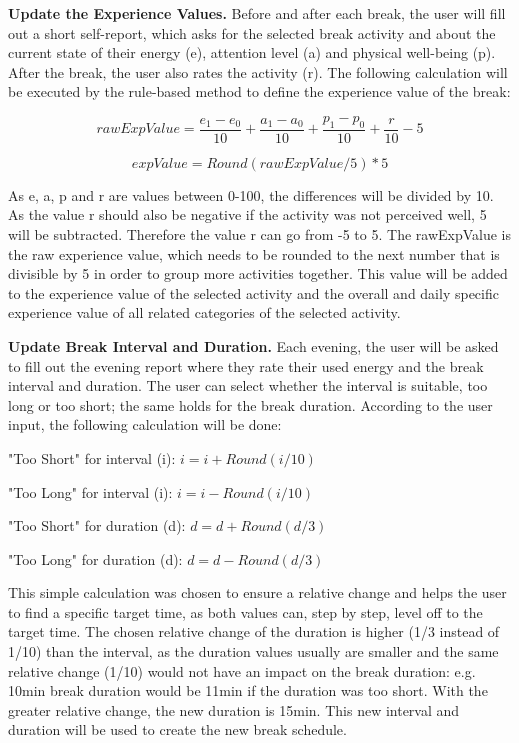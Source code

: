 \documentclass{hasel_thesis}
\begin{document}
\textbf{Update the Experience Values.} Before and after each break, the user will fill out a short self-report, which asks for the selected break activity and about the current state of their energy (e), attention level (a) and physical well-being (p). After the break, the user also rates the activity (r). The following calculation will be executed by the rule-based method to define the experience value of the break:

$$ rawExpValue = \frac{e_1- e_0}{10} + \frac{a_1- a_0}{10} + \frac{p_1-p_0}{10} + \frac{r}{10} -5$$

$$ expValue = Round(rawExpValue/5)*5$$

As e, a, p and r are values between 0-100, the differences will be divided by 10. As the value r should also be negative if the activity was not perceived well, 5 will be subtracted. Therefore the value r can go from -5 to 5. The rawExpValue is the raw experience value, which needs to be rounded to the next number that is divisible by 5 in order to group more activities together. This value will be added to the experience value of the selected activity and the overall and daily specific experience value of all related categories of the selected activity.

\textbf{Update Break Interval and Duration.} Each evening, the user will be asked to fill out the evening report where they rate their used energy and the break interval and duration. The user can select whether the interval is suitable, too long or too short; the same holds for the break duration. According to the user input, the following calculation will be done:

"Too Short" for interval (i): $ i = i + Round(i/10) $

"Too Long" for interval (i): $ i = i - Round(i/10) $

"Too Short" for duration (d): $ d = d + Round(d/3) $

"Too Long" for duration (d): $ d = d - Round(d/3) $

This simple calculation was chosen to ensure a relative change and helps the user to find a specific target time, as both values can, step by step, level off to the target time. The chosen relative change of the duration is higher (1/3 instead of 1/10)  than the interval, as the duration values usually are smaller and the same relative change (1/10) would not have an impact on the break duration: e.g. 10min break duration would be 11min if the duration was too short. With the greater relative change, the new duration is 15min. This new interval and duration will be used to create the new break schedule.
\end{document}
